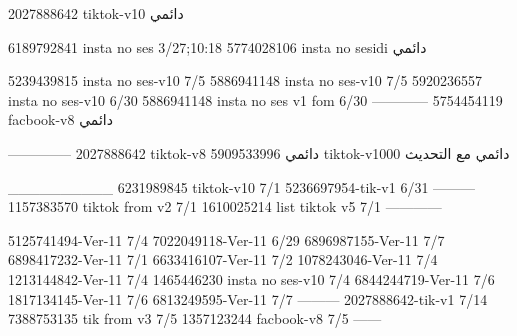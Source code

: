 2027888642 tiktok-v10
دائمي

6189792841 insta no ses
3/27;10:18
5774028106 insta no sesidi
دائمي

5239439815 insta no ses-v10
7/5
5886941148 insta no ses-v10
7/5
5920236557 insta no ses-v10
6/30
5886941148 insta no ses v1 fom
6/30
------------
5754454119 facbook-v8
دائمي


--------------
2027888642 tiktok-v8
دائمي
5909533996 tiktok-v1000
دائمي مع التحديث

__________
6231989845 tiktok-v10
7/1
5236697954-tik-v1
6/31
---------
1157383570 tiktok from v2
7/1
1610025214 list tiktok v5
7/1
------------

5125741494-Ver-11
7/4
7022049118-Ver-11
6/29
6896987155-Ver-11
7/7
6898417232-Ver-11
7/1
6633416107-Ver-11
7/2
1078243046-Ver-11
7/4
1213144842-Ver-11
7/4
1465446230 insta no ses-v10
7/4
6844244719-Ver-11
7/6
1817134145-Ver-11
7/6
6813249595-Ver-11
7/7
---------
2027888642-tik-v1
7/14
7388753135 tik from v3
7/5
1357123244 facbook-v8
7/5
------
